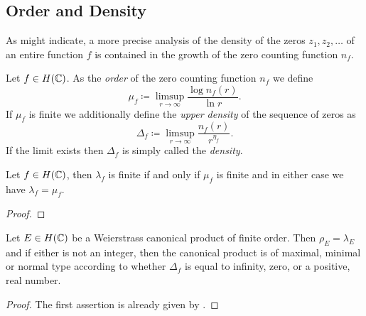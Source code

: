 \subsection{Order and Density}

As  might indicate, a more precise analysis of the density of the zeros $z_1, z_2, \hdots$ of an entire function $f$ is contained in the growth of the zero counting function $n_f$.

\begin{definition} \label{def:order-density-zero-counting}
    Let $f \in H(\mathbb{C})$. As the \emph{order} of the zero counting function $n_f$ we define
    \begin{equation}
        \mu_f \coloneqq \limsup_{r \to \infty} \frac{\log n_f(r)}{\ln r}.
    \end{equation}
    If $\mu_f$ is finite we additionally define the \emph{upper density} of the sequence of zeros as
    \begin{equation}
        \Delta_f \coloneqq \limsup_{r \to \infty} \frac{n_f(r)}{r^{\eta_f}}.
    \end{equation}
    If the limit exists then $\Delta_f$ is simply called the \emph{density}.
\end{definition}

\begin{proposition}
    Let $f \in H(\mathbb{C})$, then $\lambda_f$ is finite if and only if $\mu_f$ is finite and in either case we have $\lambda_f = \mu_f$.
\end{proposition}

\begin{proof}
\end{proof}

\begin{theorem}
    Let $E \in H(\mathbb{C})$ be a Weierstrass canonical product of finite order. Then $\rho_E = \lambda_E$ and if either is not an integer, then the canonical product is of maximal, minimal or normal type according to whether $\Delta_f$ is equal to infinity, zero, or a positive, real number.
\end{theorem}

\begin{proof}
    The first assertion is already given by .
    
\end{proof}